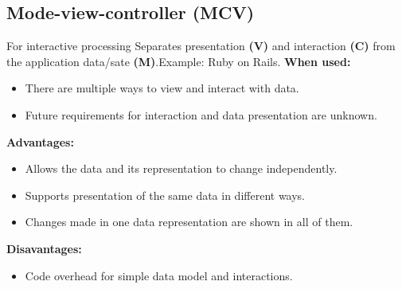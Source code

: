 \documentclass[../ESOF_notes.tex]{subfiles}
\begin{document}
    \subsection{Mode-view-controller (MCV)}
    For interactive processing
    Separates presentation \textbf{(V)} and interaction \textbf{(C)} from the application data/sate \textbf{(M)}.\newline Example: Ruby on Rails.\newline\newline
        \textbf{When used:} 
        \begin{itemize}
            \item There are multiple ways to view and interact with data.
            \item Future requirements for interaction and data presentation are unknown.
        \end{itemize} \textbf{Advantages:} 
        \begin{itemize}
            \item Allows the data and its representation to change independently.
            \item Supports presentation of the same data in different ways.
            \item Changes made in one data representation are shown in all of them.
        \end{itemize}
        \textbf{Disavantages:}
        \begin{itemize}
            \item Code overhead for simple data model and interactions.
        \end{itemize}
        
\end{document}
